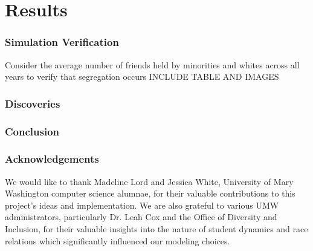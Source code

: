 \documentclass{beamer}
\begin{document}
%
%

\section{Results}

\begin{frame}
\frametitle{Simulation Verification}
Consider the average number of friends held by minorities and whites across all years to verify that segregation occurs INCLUDE TABLE AND IMAGES
\end{frame}


\begin{frame}
\frametitle{Discoveries}

\end{frame}


\begin{frame}
\frametitle{Conclusion}

\end{frame}


\begin{frame}
\frametitle{Acknowledgements}
We would like to thank Madeline Lord and Jessica White, University of Mary Washington computer science alumnae, for their valuable contributions to this project's ideas and implementation. We are also grateful to various UMW administrators, particularly Dr. Leah Cox and the Office of Diversity and Inclusion, for their valuable insights into the nature of student dynamics and race relations which significantly influenced our modeling choices.
\end{frame}
\end{document}

